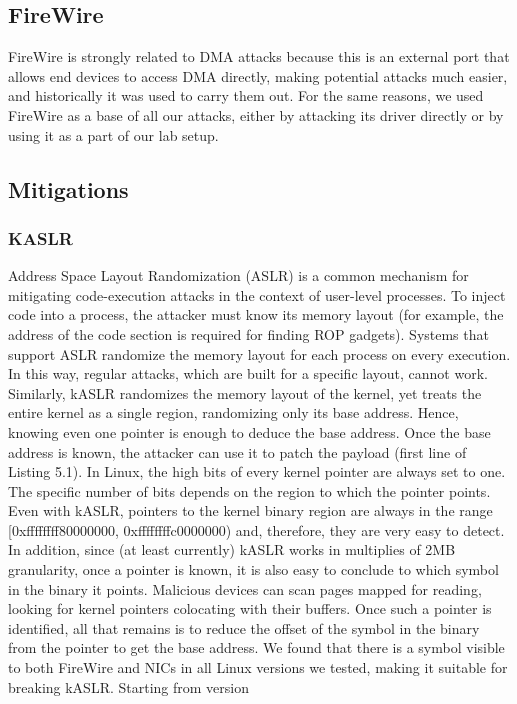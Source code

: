 \subsection{FireWire}
 FireWire is strongly related to DMA attacks because this is an external port that allows end devices to access DMA directly, making potential attacks much easier, and historically it was used to carry them out. For the same reasons, we used FireWire as a base of all our attacks, either by attacking its driver directly or by using it as a part of our lab setup.
\subsection{Mitigations}
\subsubsection{KASLR}
Address Space Layout Randomization (ASLR) is a common mechanism for mitigating
code-execution attacks in the context of user-level processes. To inject code into a
process, the attacker must know its memory layout (for example, the address of the code
section is required for finding ROP gadgets). Systems that support ASLR randomize the
memory layout for each process on every execution. In this way, regular attacks, which
are built for a specific layout, cannot work. Similarly, kASLR randomizes the memory
layout of the kernel, yet treats the entire kernel as a single region, randomizing only its
base address. Hence, knowing even one pointer is enough to deduce the base address.
Once the base address is known, the attacker can use it to patch the payload (first line of Listing 5.1).
In Linux, the high bits of every kernel pointer are always set to one. The specific number of bits depends on the region to which the pointer points. Even with
kASLR, pointers to the kernel binary region are always in the range [0xffffffff80000000,
0xffffffffc0000000) and, therefore, they are very easy to detect. In addition, since (at
least currently) kASLR works in multiplies of 2MB granularity, once a pointer is known,
it is also easy to conclude to which symbol in the binary it points. Malicious devices
can scan pages mapped for reading, looking for kernel pointers colocating with their
buffers. Once such a pointer is identified, all that remains is to reduce the offset of the
symbol in the binary from the pointer to get the base address.
We found that there is a symbol visible to both FireWire and NICs in all Linux
versions we tested, making it suitable for breaking kASLR. Starting from version

